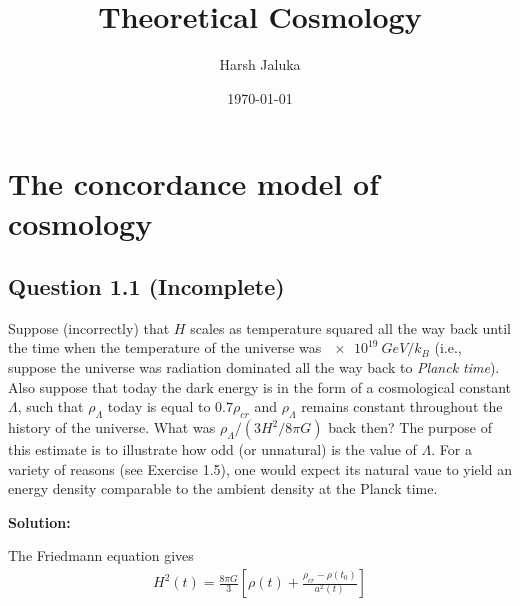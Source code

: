 \documentclass[11pt]{article}
\title{Theoretical Cosmology}
\author{Harsh Jaluka}
\date{\today}
\begin{document}
\begin{titlepage}
\maketitle 
\end{titlepage}

\newpage 
\tableofcontents

\newpage

\section{The concordance model of cosmology}
\subsection{Question 1.1 (Incomplete)}

Suppose (incorrectly) that $H$ scales as temperature squared all the way back until the time when the temperature of the universe was $\qty{e19}{GeV/k_B}$ (i.e., suppose the universe was radiation dominated all the way back to \textit{Planck time}). Also suppose that today the dark energy is in the form of a cosmological constant $\Lambda$, such that $\rho_\Lambda$ today is equal to $0.7 \rho_{cr}$ and $\rho_\Lambda$ remains constant throughout the history of the universe. What was $\rho_\Lambda / (3H^2 / 8\pi G)$ back then? The purpose of this estimate is to illustrate how odd (or unnatural) is the value of $\Lambda$. For a variety of reasons (see Exercise 1.5), one would expect its natural vaue to yield an energy density comparable to the ambient density at the Planck time. 

\textbf{Solution:}

The Friedmann equation gives
\begin{align*}
    H^2(t) = \frac{8\pi G}{3} \left[ \rho(t) + \frac{\rho_{cr} - \rho(t_0)}{a^2(t)} \right] 
\end{align*}
\end{document}
